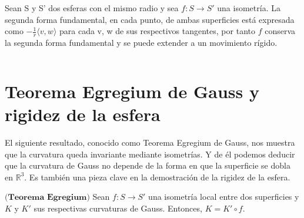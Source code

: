 \begin{ejemplo}
	Sean S y S' dos esferas con el mismo radio y sea $f : S \to S'$ una isometría. La segunda forma fundamental, en cada punto, de ambas superficies está expresada como $-\frac{1}{r} \langle v,w \rangle$ para cada v, w de sus respectivos tangentes, por tanto $f$ conserva la segunda forma fundamental y se puede extender a un movimiento rígido.
\end{ejemplo}
${ }$\\


	${ }$\\
\section{Teorema Egregium de Gauss y rigidez de la esfera}
	${ }$\\

El siguiente resultado, conocido como Teorema Egregium de Gauss, nos muestra que la curvatura queda invariante mediante isometrías. Y de él podemos deducir que la curvatura de Gauss no depende de la forma en que la superficie se dobla en $\mathbb{R}^3$. Es también una pieza clave en la demostración de la rigidez de la esfera.
${ }$\\

\begin{teorema} \label{teo:egre}
	$\textbf{(Teorema Egregium)}$ Sean $f : S \to S'$ una isometría local entre dos superficies y $K$ y $K'$ sus respectivas curvaturas de Gauss. Entonces, $K = K'\circ f$.
\end{teorema}

